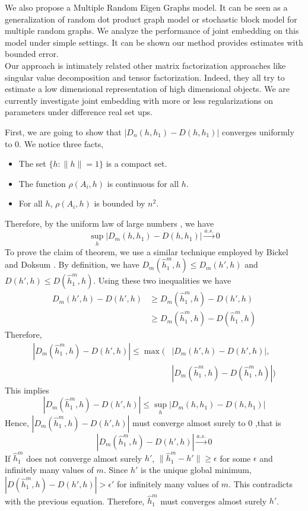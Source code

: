 \documentclass[10pt,journal,compsoc]{IEEEtran}
\newenvironment{proof}[1][Proof]{\begin{trivlist}
		\item[\hskip \labelsep {\bfseries #1}]}{\end{trivlist}}
\begin{document}
\noindent We also propose a Multiple Random Eigen Graphs model. It can be seen as a generalization of random dot product graph model or stochastic block model for multiple random graphs. We analyze the performance of joint embedding on this model under simple settings. It can be shown our method provides estimates with bounded error. \\

\noindent Our approach is intimately related other matrix factorization approaches like singular value decomposition and tensor factorization. Indeed, they all try to estimate a low dimensional representation of high dimensional objects. We are currently investigate joint embedding with more or less regularizations on parameters under difference real set ups.  

\appendix
\begin{proof} [Proof of Theorem 4.1]
First,  we are going to show that $|D_n(h,h_1)-D(h,h_1)|$ converges uniformly to $0$.
We notice three facts,
\begin{itemize}
	\item[(1)] The set $\{h: \|h\|=1\}$ is a compact set.
	\item[(2)] The function $\rho(A_i,h)$ is continuous for all $h$.
	\item[(3)] For all $h$, $\rho(A_i,h)$ is bounded by $n^2$.
\end{itemize}
Therefore, by the uniform law of large numbers \cite{jennrich1969asymptotic}, we have
\[\underset{h}{\sup}|D_m(h,h_1)-D(h,h_1)|\overset{a.s.}{\rightarrow} 0\]
To prove the claim of theorem, we use a similar technique employed by Bickel and Doksum \cite{bickel2015mathematical}. By definition, we have $D_m(\hat{h}_1^m,h)  \leq D_m(h',h)$ and $D(h',h) \leq D(\hat{h}_1^m,h)$. Using these two inequalities we have
\begin{align*}
D_m(h',h)-D(h',h) &\geq D_m(\hat{h}_1^m,h)-D(h',h) \\
&\geq D_m(\hat{h}_1^m,h)-D(\hat{h}_1^m,h) 
\end{align*}
Therefore, 
\begin{align*}
|D_m(\hat{h}_1^m,h)-D(h',h)|  \leq  \max(&|D_m(h',h)-D(h',h)|,\\
& |D_m(\hat{h}_1^m,h)-D(\hat{h}_1^m,h)|)
\end{align*}
This implies 
\[ |D_m(\hat{h}_1^m,h)-D(h',h)| \leq \underset{h}{\sup}|D_m(h,h_1)-D(h,h_1)| \]
Hence, $|D_m(\hat{h}_1^m,h)-D(h',h)|$ must converge almost surely to $0$ ,that is
\[|D_m(\hat{h}_1^m,h)-D(h',h)|\overset{a.s.}{\rightarrow} 0 \]
 If $\hat{h}_1^m$ does not converge almost surely $h'$, $\|\hat{h}_1^m-h'\|\geq \epsilon$ for some $\epsilon$ and infinitely many values of $m$. Since $h'$ is the unique global minimum, $|D(\hat{h}_1^m,h)-D(h',h)| > \epsilon' $ for infinitely many values of $m$. This contradicts with the previous equation. Therefore, $\hat{h}_1^m$ must converges almost surely $h'$.
	
\end{proof}
\end{document}
